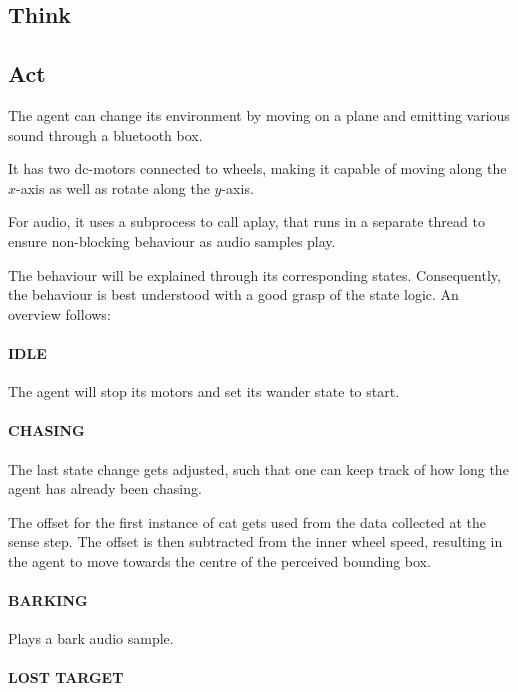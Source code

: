 \documentclass[conference]{IEEEtran}
\begin{document}
\subsection{Think}

\subsection{Act}

The agent can change its environment by moving on a plane and emitting various sound through a bluetooth box.

It has two dc-motors connected to wheels, making it capable of moving along the $x$-axis as well as rotate along the $y$-axis.

For audio, it uses a subprocess to call aplay, that runs in a separate thread to ensure non-blocking behaviour as audio samples play.

The behaviour will be explained through its corresponding states. Consequently, the behaviour is best understood with a good grasp of the state logic. An overview follows:

\paragraph{IDLE} 

The agent will stop its motors and set its wander state to start.

\paragraph{CHASING} 

The last state change gets adjusted, such that one can keep track of how long the agent has already been chasing.

The offset for the first instance of cat gets used from the data collected at the sense step. The offset is then subtracted from the inner wheel speed, resulting in the agent to move towards the centre of the perceived bounding box. 

\paragraph{BARKING}

Plays a bark audio sample.


\paragraph{LOST TARGET}
\end{document}
